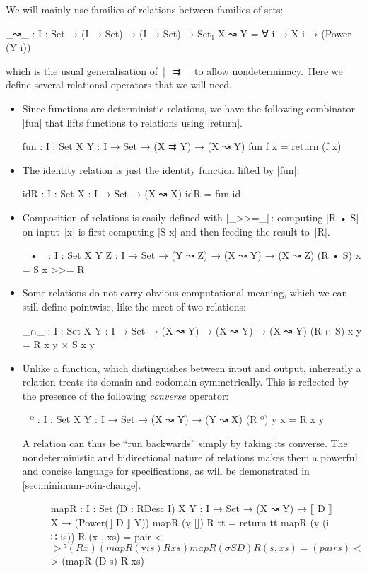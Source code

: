 We will mainly use families of relations between families of sets:
\begin{code}
_↝_ : {I : Set} → (I → Set) → (I → Set) → Set₁
X ↝ Y = ∀ {i} → X i → (Power (Y i))
\end{code}
which is the usual generalisation of~|_⇉_| to allow nondeterminacy.\
Here we define several relational operators that we will need.
\begin{itemize}
\item Since functions are deterministic relations, we have the following combinator |fun| that lifts functions to relations using |return|.
\begin{code}
fun : {I : Set} {X Y : I → Set} → (X ⇉ Y) → (X ↝ Y)
fun f x = return (f x)
\end{code}
\item The identity relation is just the identity function lifted by |fun|.
\begin{code}
idR : {I : Set} {X : I → Set} → (X ↝ X)
idR = fun id
\end{code}
\item Composition of relations is easily defined with |_>>=_|\,: computing |R • S| on input~|x| is first computing |S x| and then feeding the result to~|R|.
\begin{code}
_•_ : {I : Set} {X Y Z : I → Set} → (Y ↝ Z) → (X ↝ Y) → (X ↝ Z)
(R • S) x = S x >>= R
\end{code}
\item Some relations do not carry obvious computational meaning, which we can still define pointwise, like the meet of two relations:
\begin{code}
_∩_ : {I : Set} {X Y : I → Set} → (X ↝ Y) → (X ↝ Y) → (X ↝ Y)
(R ∩ S) x y = R x y × S x y
\end{code}
\item Unlike a function, which distinguishes between input and output, inherently a relation treats its domain and codomain symmetrically.
This is reflected by the presence of the following \emph{converse} operator:
\begin{code}
_º : {I : Set} {X Y : I → Set} → (X ↝ Y) → (Y ↝ X)
(R º) y x = R x y
\end{code}
A relation can thus be ``run backwards'' simply by taking its converse.
The nondeterministic and bidirectional nature of relations makes them a powerful and concise language for specifications, as will be demonstrated in \autoref{sec:minimum-coin-change}.
\begin{figure}
\codefigure
\begin{code}
mapR :  {I : Set} (D : RDesc I) {X Y : I → Set} →
        (X ↝ Y) → ⟦ D ⟧ X → (Power(⟦ D ⟧ Y))
mapR (ṿ [])        R tt        =  return tt
mapR (ṿ (i ∷ is))  R (x , xs)  =  pair <$>² (R x) (mapR (ṿ is) R xs)
mapR (σ S D)       R (s , xs)  =  (pair s) <$> (mapR (D s) R xs)


\end{code}
\end{figure}
\end{itemize}
